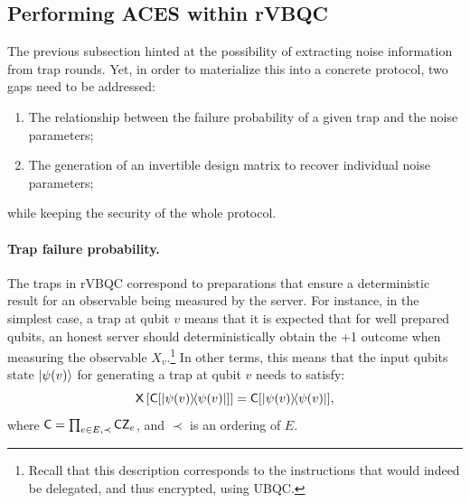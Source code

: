 \subsection{Performing ACES within rVBQC}
The previous subsection hinted at the possibility of extracting noise information from trap rounds. Yet, in order to materialize this into a concrete protocol, two gaps need to be addressed:
\begin{enumerate}
\item The relationship between the failure probability of a given trap and the noise parameters;
\item The generation of an invertible design matrix to recover individual noise parameters;
\end{enumerate}
while keeping the security of the whole protocol.

\paragraph{Trap failure probability.}
The traps in rVBQC correspond to preparations that ensure a deterministic result for an observable being measured by the server. For instance, in the simplest case, a trap at qubit \(v\) means that it is expected that for well prepared qubits, an honest server should deterministically obtain the +1 outcome when measuring the observable \(X_{v}\).\footnote{Recall that this description corresponds to the instructions that would indeed be delegated, and thus encrypted, using UBQC.} In other terms, this means that the input qubits state \(\ket{\psi(v)}\) for generating a trap at qubit \(v\) needs to satisfy:
\begin{equation}
\mathsf{X}\left[\mathsf{C} [\ketbra{\psi(v)}] \right] = \mathsf{C}[\ketbra{\psi(v)}],
\end{equation}
where \(\mathsf{C} = \prod_{e\in E,\prec}\mathsf{CZ}_{e}\), and \(\prec\) is an ordering of $E$.

